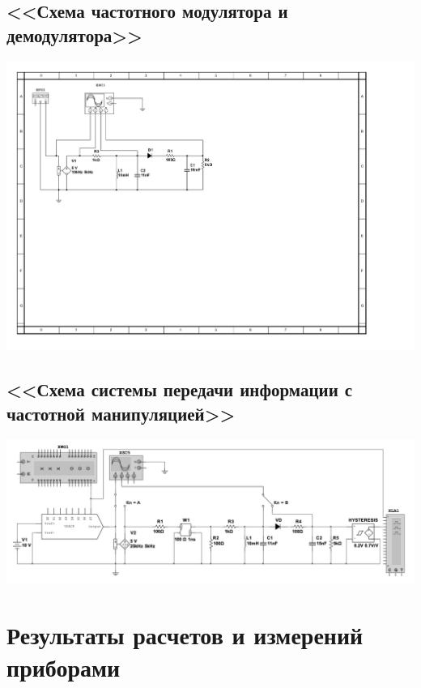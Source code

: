 \documentclass[11pt]{article}
\begin{document}
\subsection{<<Схема частотного модулятора и демодулятора>>}
\includegraphics[width=1\linewidth]{img/2/scheme.jpg}
\subsection{<<Схема системы передачи информации с частотной манипуляцией>>}
\includegraphics[width=1\linewidth]{img/3/scheme.png}
\section{Результаты расчетов и измерений приборами}
\end{document}
